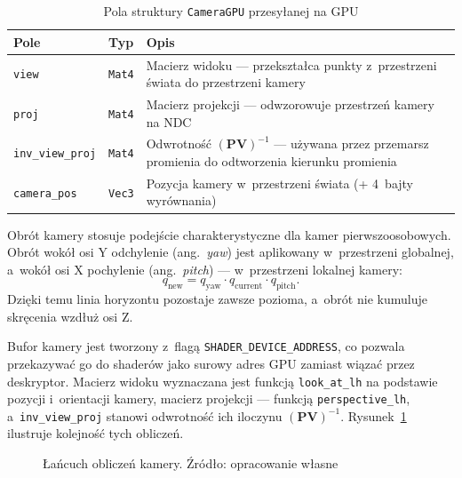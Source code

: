 \begin{table}[htbp]
\centering
\caption{Pola struktury \texttt{CameraGPU} przesyłanej na GPU}
\label{tab:camera_gpu}
\begin{tabular}{llp{6.5cm}}
\toprule
\textbf{Pole} & \textbf{Typ} & \textbf{Opis} \\
\midrule
\texttt{view}           & \texttt{Mat4} & Macierz widoku --- przekształca punkty z~przestrzeni świata do przestrzeni kamery \\[3pt]
\texttt{proj}           & \texttt{Mat4} & Macierz projekcji --- odwzorowuje przestrzeń kamery na NDC \\[3pt]
\texttt{inv\_view\_proj}& \texttt{Mat4} & Odwrotność $(\mathbf{P}\mathbf{V})^{-1}$ --- używana przez przemarsz promienia do odtworzenia kierunku promienia \\[3pt]
\texttt{camera\_pos}    & \texttt{Vec3} & Pozycja kamery w~przestrzeni świata (+ 4~bajty wyrównania) \\
\bottomrule
\end{tabular}
\end{table}

Obrót kamery stosuje podejście charakterystyczne dla kamer pierwszoosobowych.
Obrót wokół osi Y {odchylenie} (ang.~\textit{yaw}) jest aplikowany
w~przestrzeni globalnej, a~wokół osi X pochylenie (ang.~\textit{pitch}) --- w~przestrzeni lokalnej kamery:
\begin{equation}
  q_{\text{new}} = q_{\text{yaw}} \cdot q_{\text{current}} \cdot q_{\text{pitch}}.
  \label{eq:camera_rot}
\end{equation}
Dzięki temu linia horyzontu pozostaje zawsze pozioma, a~obrót nie kumuluje
skręcenia wzdłuż osi Z.

Bufor kamery jest tworzony z~flagą \texttt{SHADER\_DEVICE\_ADDRESS}, co
pozwala przekazywać go do shaderów jako surowy adres GPU zamiast wiązać
przez deskryptor. Macierz widoku wyznaczana jest funkcją
\texttt{look\_at\_lh} na podstawie pozycji i~orientacji kamery, macierz
projekcji --- funkcją \texttt{perspective\_lh},
a~\texttt{inv\_view\_proj}\cite{glam} stanowi odwrotność ich iloczynu $(\mathbf{P}\mathbf{V})^{-1}$.
Rysunek~\ref{fig:camera_chain} ilustruje kolejność tych obliczeń.

\begin{figure}[htbp]
\centering
{}
\caption{Łańcuch obliczeń kamery. Źródło: opracowanie własne}
\label{fig:camera_chain}
\end{figure}

